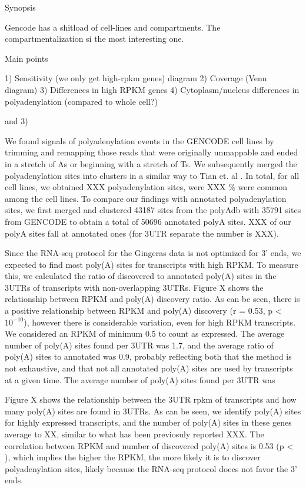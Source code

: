 \documentclass[a4paper]{article}
\begin{document}
 
Synopsis

Gencode has a shitload of cell-lines and compartments. The compartmentalization
si the most interesting one.

Main points

1) Sensitivity (we only get high-rpkm genes) diagram
2) Coverage (Venn diagram)
3) Differences in high RPKM genes
4) Cytoplasm/nucleus differences in polyadenylation (compared to whole cell?)

and 3) %

We found signals of polyadenylation events in the GENCODE cell lines by
trimming and remapping those reads that were originally unmappable and ended in
a stretch of As or beginning with a stretch of Ts. We subsequently merged the
polyadenylation sites into clusters in a similar way to Tian et. al
\cite{tian_large-scale_2005}. In total, for all cell lines, we obtained XXX
polyadenylation sites, were XXX \% were common among the cell lines. To compare
our findings with annotated polyadenylation sites, we first merged and
clustered 43187 sites from the polyAdb with 35791 sites from GENCODE to obtain
a total of 50696 annotated polyA sites. XXX of our polyA sites fall at
annotated ones (for 3UTR separate the number is XXX).

Since the RNA-seq protocol for the Gingeras data is not optimized for 3' ends,
we expected to find most poly(A) sites for transcripts with high RPKM. To
measure this, we calculated the ratio of discovered to annotated poly(A) sites
in the 3UTRs of transcripts with non-overlapping 3UTRs. Figure X shows the
relationship between RPKM and poly(A) discovery ratio. As can be seen, there is
a positive relationship between RPKM and poly(A) discovery (r = 0.53, p <
$10^{-10}$), however there is considerable variation, even for high RPKM
transcripts. We considered an RPKM of minimum 0.5 to count as expressed. The
average number of poly(A) sites found per 3UTR was 1.7, and the average ratio
of poly(A) sites to annotated was 0.9, probably reflecting both that the method
is not exhaustive, and that not all annotated poly(A) sites are used by
transcripts at a given time. The average number of poly(A) sites found per 3UTR
was

Figure X shows the relationship
between the 3UTR rpkm of transcripts and how many poly(A) sites are found in
3UTRs. As can be seen, we identify poly(A) sites for highly expressed
transcripts, and the number of poly(A) sites in these genes average to XX,
similar to what has been previosuly reported XXX. The correlation between RPKM
and number of discovered poly(A) sites is 0.53 (p < ), which implies
the higher the RPKM, the more likely it is to discover polyadenylation sites,
likely because the RNA-seq protocol doees not favor the 3' ends.
\end{document}
